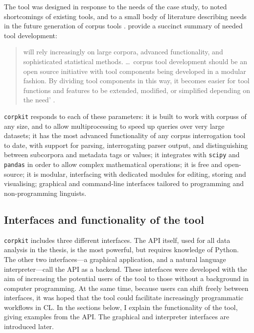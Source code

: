 The tool was designed in response to the needs of the case study, to noted shortcomings of existing tools, and to a small body of literature describing needs in the future generation of \gls{corpus} tools \cite[e.g.][]{anthony_critical_2013,anthony_developing_2006,gries_50-something_2013}. \textcite{anthony_critical_2013} provide a succinct summary of needed tool development:

\begin{quote} \small {} will rely increasingly on large corpora, advanced functionality, and sophisticated statistical methods. \ldots~\Gls{corpus} tool development should be an open source initiative with tool components being developed in a modular fashion. By dividing tool components in this way, it becomes easier for tool functions and features to be extended, modified, or simplified depending on the need' \parencite*[pp.~155--156]{anthony_critical_2013}.
\end{quote}
%
\texttt{corpkit} responds to each of these parameters: it is built to work with \glspl{corpus} of any size, and to allow multiprocessing to speed up queries over very large datasets; it has the most advanced functionality of any corpus interrogation tool to date, with support for parsing, interrogating parser output, and distinguishing between subcorpora and metadata tags or values; it integrates with \texttt{scipy} \cite{scipy2001} and \texttt{pandas} \cite{mckinney_pandas_2010} in order to allow complex mathematical operations; it is free and open\hyp{}source; it is modular, interfacing with dedicated modules for editing, storing and visualising; graphical and command\hyp{}line interfaces tailored to programming and non\hyp{}programming linguists.

\subsection{Interfaces and functionality of the tool}

\texttt{corpkit} includes three different interfaces. The \gls{API} itself, used for all data analysis in the thesis, is the most powerful, but requires knowledge of Python. The other two interfaces---a graphical application, and a natural language interpreter---call the \gls{API} as a backend. These interfaces were developed with the aim of increasing the potential users of the tool to those without a background in computer programming. At the same time, because users can shift freely between interfaces, it was hoped that the tool could facilitate increasingly programmatic workflows in \gls{CL}. In the sections below, I explain the functionality of the tool, giving examples from the \gls{API}. The graphical and interpreter interfaces are introduced later.


